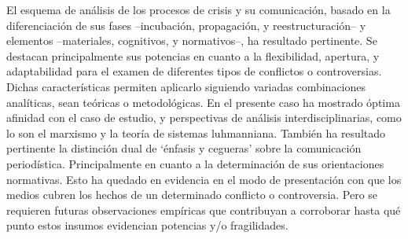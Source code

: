 \documentclass{textolivre}
\begin{document}
El esquema de análisis de los procesos de crisis y su comunicación, basado en la
diferenciación de sus fases --incubación, propagación, y reestructuración-- y elementos
--materiales, cognitivos, y normativos--, ha resultado pertinente. Se destacan
principalmente sus potencias en cuanto a la flexibilidad, apertura, y adaptabilidad para el
examen de diferentes tipos de conflictos o controversias. Dichas características permiten
aplicarlo siguiendo variadas combinaciones analíticas, sean teóricas o metodológicas. En
el presente caso ha mostrado óptima afinidad con el caso de estudio, y perspectivas de
análisis interdisciplinarias, como lo son el marxismo y la teoría de sistemas luhmanniana.
También ha resultado pertinente la distinción dual de ‘énfasis y cegueras’ sobre la
comunicación periodística. Principalmente en cuanto a la determinación de sus
orientaciones normativas. Esto ha quedado en evidencia en el modo de presentación con
que los medios cubren los hechos de un determinado conflicto o controversia. Pero se
requieren futuras observaciones empíricas que contribuyan a corroborar hasta qué punto
estos insumos evidencian potencias y/o fragilidades.




\printbibliography\label{sec-bib}
\end{document}
